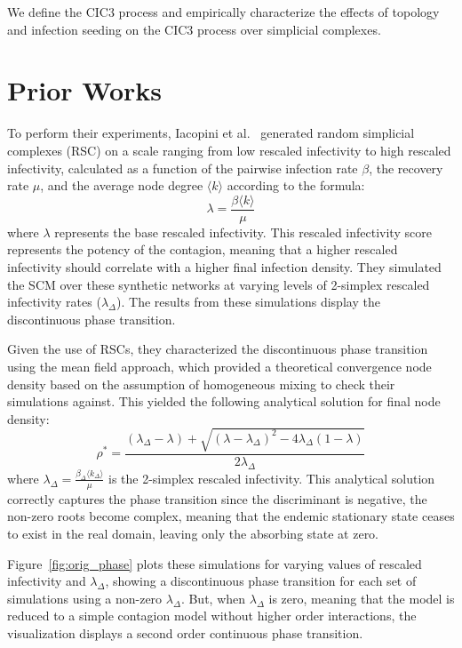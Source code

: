 \documentclass[sigconf]{acmart}
\begin{document}
We define the CIC3 process and empirically characterize the effects of topology and infection seeding on the CIC3 process over simplicial complexes.

\section{Prior Works}
\label{sec:prior}

To perform their experiments, Iacopini et al.~\cite{iacopini2019} generated random simplicial complexes (RSC) on a scale ranging from low rescaled infectivity to high rescaled infectivity, calculated as a function of the pairwise infection rate $\beta$, the recovery rate $\mu$, and the average node degree $\langle k \rangle$ according to the formula:
\begin{equation}
\lambda = \frac{\beta \langle k \rangle}{\mu}
\label{eq:lambda}
\end{equation}
where $\lambda$ represents the base rescaled infectivity. This rescaled infectivity score represents the potency of the contagion, meaning that a higher rescaled infectivity should correlate with a higher final infection density. They simulated the SCM over these synthetic networks at varying levels of 2-simplex rescaled infectivity rates ($\lambda_{\Delta}$). The results from these simulations display the discontinuous phase transition.

Given the use of RSCs, they characterized the discontinuous phase transition using the mean field approach, which provided a theoretical convergence node density based on the assumption of homogeneous mixing to check their simulations against. This yielded the following analytical solution for final node density:
\begin{equation}
\rho^{*} = \frac{(\lambda_{\Delta} - \lambda) + \sqrt{(\lambda - \lambda_{\Delta})^2 - 4\lambda_{\Delta}(1 - \lambda)}}{2\lambda_{\Delta}}
\label{eq:rho_star}
\end{equation}
where $\lambda_{\Delta} = \frac{\beta_{\Delta}\langle k_{\Delta}\rangle}{\mu}$ is the 2-simplex rescaled infectivity. This analytical solution correctly captures the phase transition since the discriminant is negative, the non-zero roots become complex, meaning that the endemic stationary state ceases to exist in the real domain, leaving only the absorbing state at zero.

Figure~\ref{fig:orig_phase} plots these simulations for varying values of rescaled infectivity and $\lambda_{\Delta}$, showing a discontinuous phase transition for each set of simulations using a non-zero $\lambda_{\Delta}$. But, when $\lambda_{\Delta}$ is zero, meaning that the model is reduced to a simple contagion model without higher order interactions, the visualization displays a second order continuous phase transition.
\end{document}
